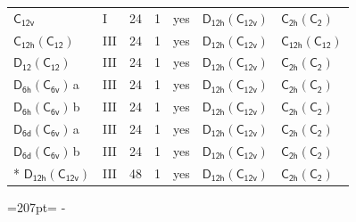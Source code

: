 \documentclass[10pt,a4paper]{article}
\newcommand{\needspace}[1]{\par\penalty-100\begingroup\dimen0=#1\relax\dimen2=\pagegoal
  \advance\dimen2-\pagetotal\ifdim\dimen0>\dimen2\relax\ifdim\dimen2>0pt\vfil\break\fi\fi
  \endgroup}
\numberwithin{equation}{section}
\newcommand{\grp}[1]{\mathsf{#1}}
\newcommand{\clsletter}[1]{\,{\scriptsize\color{black!55}#1}}
\begin{document}
{\begin{longtable}{@{}llrrlll@{}}
\href{../../../rotation/data/pdf/C12v.pdf}{$\grp{C_{12v}}$} & I & 24 & 1 & yes & \href{D12h-C12v.pdf}{$\grp{D_{12h}}(\grp{C_{12v}})$} & \href{C2h-C2.pdf}{$\grp{C_{2h}}(\grp{C_{2}})$}\\
\href{C12h-C12.pdf}{$\grp{C_{12h}}(\grp{C_{12}})$} & III & 24 & 1 & yes & \href{D12h-C12v.pdf}{$\grp{D_{12h}}(\grp{C_{12v}})$} & \href{C12h-C12.pdf}{$\grp{C_{12h}}(\grp{C_{12}})$}\\
\href{D12-C12.pdf}{$\grp{D_{12}}(\grp{C_{12}})$} & III & 24 & 1 & yes & \href{D12h-C12v.pdf}{$\grp{D_{12h}}(\grp{C_{12v}})$} & \href{C2h-C2.pdf}{$\grp{C_{2h}}(\grp{C_{2}})$}\\
\href{D6h-C6v.pdf}{$\grp{D_{6h}}(\grp{C_{6v}})$}\clsletter{a} & III & 24 & 1 & yes & \href{D12h-C12v.pdf}{$\grp{D_{12h}}(\grp{C_{12v}})$} & \href{C2h-C2.pdf}{$\grp{C_{2h}}(\grp{C_{2}})$}\\
\href{D6h-C6v.pdf}{$\grp{D_{6h}}(\grp{C_{6v}})$}\clsletter{b} & III & 24 & 1 & yes & \href{D12h-C12v.pdf}{$\grp{D_{12h}}(\grp{C_{12v}})$} & \href{C2h-C2.pdf}{$\grp{C_{2h}}(\grp{C_{2}})$}\\
\href{D6d-C6v.pdf}{$\grp{D_{6d}}(\grp{C_{6v}})$}\clsletter{a} & III & 24 & 1 & yes & \href{D12h-C12v.pdf}{$\grp{D_{12h}}(\grp{C_{12v}})$} & \href{C2h-C2.pdf}{$\grp{C_{2h}}(\grp{C_{2}})$}\\
\href{D6d-C6v.pdf}{$\grp{D_{6d}}(\grp{C_{6v}})$}\clsletter{b} & III & 24 & 1 & yes & \href{D12h-C12v.pdf}{$\grp{D_{12h}}(\grp{C_{12v}})$} & \href{C2h-C2.pdf}{$\grp{C_{2h}}(\grp{C_{2}})$}\\*
\href{D12h-C12v.pdf}{$\grp{D_{12h}}(\grp{C_{12v}})$} & III & 48 & 1 & yes & \href{D12h-C12v.pdf}{$\grp{D_{12h}}(\grp{C_{12v}})$} & \href{C2h-C2.pdf}{$\grp{C_{2h}}(\grp{C_{2}})$}\\
\bottomrule\end{longtable}}
\needspace{207pt}
\end{document}

